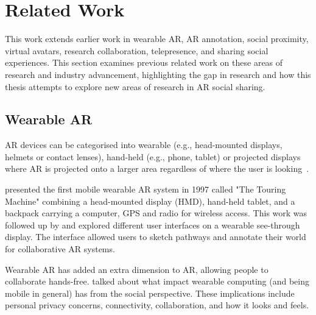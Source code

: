 \chapter{Related Work}
\label{ch:background}



This work extends earlier work in wearable AR, AR annotation, social proximity, virtual avatars, research collaboration, telepresence, and sharing social experiences. This section examines previous related work on these areas of research and industry advancement, highlighting the gap in research and how this thesis attempts to explore new areas of research in AR social sharing. 

\section{Wearable AR} 

AR devices can be categorised into wearable (e.g., head-mounted displays, helmets or contact lenses), hand-held (e.g., phone, tablet) or projected displays where AR is projected onto a larger area regardless of where the user is looking~\cite{Peddie2017}. 

\textcite{Feiner1997a} presented the first mobile wearable AR system in 1997 called "The Touring Machine" combining a head-mounted display (HMD), hand-held tablet, and a backpack carrying a computer, GPS and radio for wireless access. This work was followed up by \textcite{Hollerer1999a} and explored different user interfaces on a wearable see-through display. The interface allowed users to sketch pathways and annotate their world for collaborative AR systems. 

Wearable AR has added an extra dimension to AR, allowing people to collaborate hands-free. \textcite{Feiner1999} talked about what impact wearable computing (and being mobile in general) has from the social perspective. These implications include personal privacy concerns, connectivity, collaboration, and how it looks and feels. 

